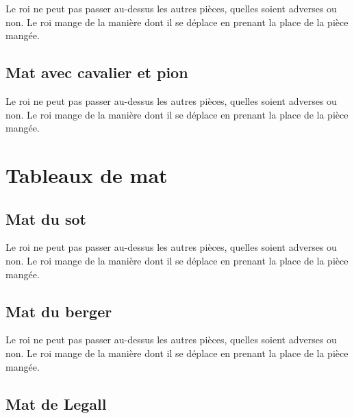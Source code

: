 \documentclass[a5paper,openany,twocolumn]{book}%
\begin{document}
Le roi ne peut pas passer au-dessus les autres pièces, quelles soient adverses ou non. Le roi mange de la manière dont il se déplace en prenant la place de la pièce mangée. 


\chapter{Mat avec cavalier et pion}

Le roi ne peut pas passer au-dessus les autres pièces, quelles soient adverses ou non. Le roi mange de la manière dont il se déplace en prenant la place de la pièce mangée. 


\part{Tableaux de mat}

\chapter{Mat du sot}
 
Le roi ne peut pas passer au-dessus les autres pièces, quelles soient adverses ou non. Le roi mange de la manière dont il se déplace en prenant la place de la pièce mangée. 


\chapter{Mat du berger}
 
Le roi ne peut pas passer au-dessus les autres pièces, quelles soient adverses ou non. Le roi mange de la manière dont il se déplace en prenant la place de la pièce mangée. 


\chapter{Mat de Legall}
\end{document}
